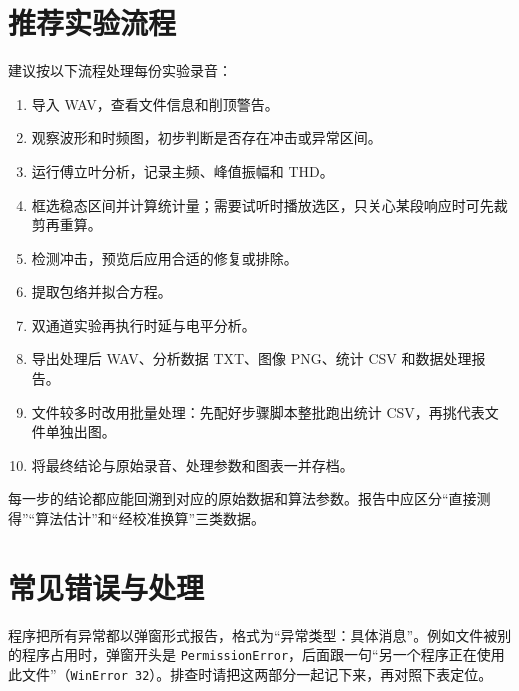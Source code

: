 \documentclass[UTF8,a4paper,12pt,scheme=chinese]{ctexart}
\begin{document}
\section{推荐实验流程}


建议按以下流程处理每份实验录音：

\begin{enumerate}
  \item 导入 WAV，查看文件信息和削顶警告。
  \item 观察波形和时频图，初步判断是否存在冲击或异常区间。
  \item 运行傅立叶分析，记录主频、峰值振幅和 THD。
  \item 框选稳态区间并计算统计量；需要试听时播放选区，只关心某段响应时可先裁剪再重算。
  \item 检测冲击，预览后应用合适的修复或排除。
  \item 提取包络并拟合方程。
  \item 双通道实验再执行时延与电平分析。
  \item 导出处理后 WAV、分析数据 TXT、图像 PNG、统计 CSV 和数据处理报告。
  \item 文件较多时改用批量处理：先配好步骤脚本整批跑出统计 CSV，再挑代表文件单独出图。
  \item 将最终结论与原始录音、处理参数和图表一并存档。
\end{enumerate}

每一步的结论都应能回溯到对应的原始数据和算法参数。报告中应区分“直接测得”“算法估计”和“经校准换算”三类数据。

\section{常见错误与处理}

程序把所有异常都以弹窗形式报告，格式为“异常类型：具体消息”。例如文件被别的程序占用时，弹窗开头是 \texttt{PermissionError}，后面跟一句“另一个程序正在使用此文件”（\texttt{WinError 32}）。排查时请把这两部分一起记下来，再对照下表定位。
\end{document}
